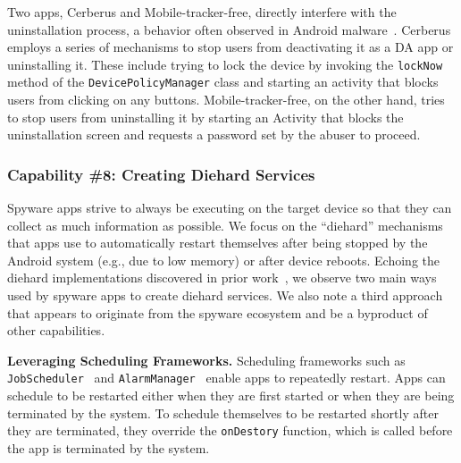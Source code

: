Two apps, Cerberus and Mobile-tracker-free, directly interfere with the
uninstallation process, a behavior often observed in Android
malware~\cite{shan2019device,aljarrah2016maintaining}. Cerberus employs a series
of mechanisms to stop users from deactivating it as a DA app or
uninstalling it. These include trying to lock the device by invoking the
\texttt{lockNow} method of the \texttt{DevicePolicyManager} class and starting
an activity that blocks users from clicking on any buttons. Mobile-tracker-free,
on the other hand, tries to stop users from uninstalling it by starting an
Activity that blocks the uninstallation screen and requests a password set
by the abuser to proceed.

\subsubsection*{Capability \#8: Creating Diehard Services}
%
Spyware apps strive to always be executing on the target device so
that they can collect as much information as possible.  We focus on
the ``diehard'' mechanisms that apps use to automatically restart
themselves after being stopped by the Android system (e.g., due to low memory) or after device
reboots. Echoing the diehard implementations discovered in prior
work~\cite{shao2019lightweight,zhou2020demystifying}, we observe two
main ways used by spyware apps to create diehard services. We also note
a third approach that appears to originate from the spyware ecosystem
and be a byproduct of other capabilities.

\textbf{Leveraging Scheduling Frameworks.} Scheduling frameworks such as
\texttt{JobScheduler}~\cite{JobSched94:online} and
\texttt{AlarmManager}~\cite{AlarmMan39:online} enable apps to repeatedly
restart. Apps can schedule to be restarted either when they are
first started or when they are being terminated by the system. To schedule
themselves to be restarted shortly after they are terminated, they override the
\texttt{onDestory} function, which is called before the app is terminated by the
system.

